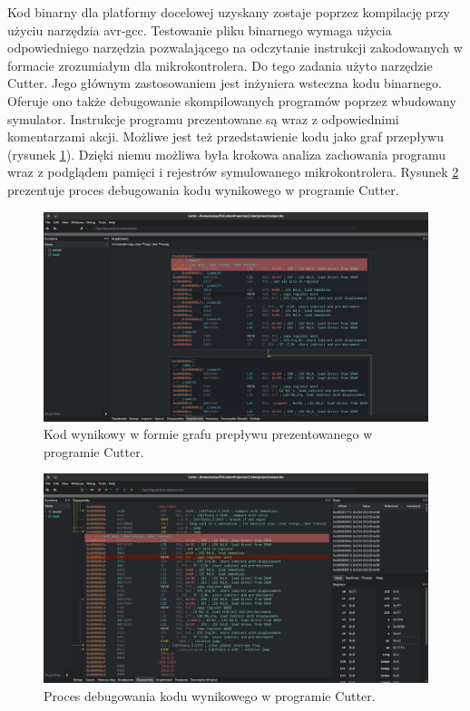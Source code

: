 Kod binarny dla platformy docelowej uzyskany zostaje poprzez kompilację przy użyciu narzędzia avr-gcc. Testowanie pliku binarnego wymaga użycia odpowiedniego narzędzia pozwalającego na odczytanie instrukcji zakodowanych w formacie zrozumiałym dla mikrokontrolera. Do tego zadania użyto narzędzie Cutter. Jego głównym zastosowaniem jest inżyniera wsteczna kodu binarnego. Oferuje ono także debugowanie skompilowanych programów poprzez wbudowany symulator. Instrukcje programu prezentowane są wraz z odpowiednimi komentarzami akcji. Możliwe jest też przedstawienie kodu jako graf przepływu (rysunek \ref{fig:cutter-graph}). Dzięki niemu możliwa była krokowa analiza zachowania programu wraz z podglądem pamięci i rejestrów symulowanego mikrokontrolera. Rysunek \ref{fig:cutter-debug} prezentuje proces debugowania kodu wynikowego w programie Cutter. 

\begin{figure}
	\includegraphics[width=1\textwidth]{graf/cutter-graph.png}
	\caption{Kod wynikowy w formie grafu prepływu prezentowanego w programie Cutter.}
	\label{fig:cutter-graph}
\end{figure}

\begin{figure}
	\includegraphics[width=1\textwidth]{graf/cutter-debug.png}
	\caption{Proces debugowania kodu wynikowego w programie Cutter.}
	\label{fig:cutter-debug}
\end{figure}

